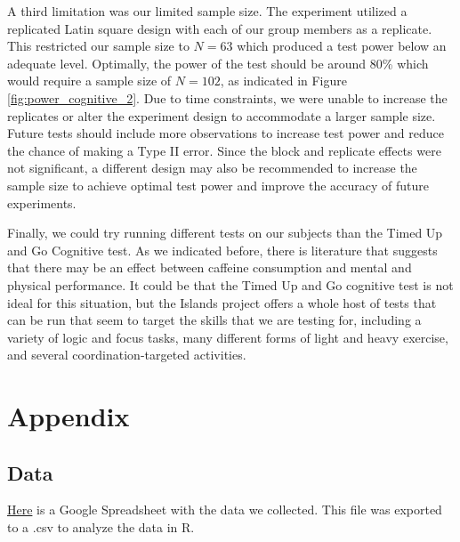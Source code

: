 \documentclass[11pt,a4paper,twoside]{tau-book}
\begin{document}
A third limitation was our limited sample size. The experiment utilized a replicated Latin square design with each of our group members as a replicate. This restricted our sample size to $N=63$ which produced a test power below an adequate level. Optimally, the power of the test should be around 80\% which would require a sample size of $N=102$, as indicated in Figure \ref{fig:power_cognitive_2}. Due to time constraints, we were unable to increase the replicates or alter the experiment design to accommodate a larger sample size. Future tests should include more observations to increase test power and reduce the chance of making a Type II error. Since the block and replicate effects were not significant, a different design may also be recommended to increase the sample size to achieve optimal test power and improve the accuracy of future experiments.

Finally, we could try running different tests on our subjects than the Timed Up and Go Cognitive test. As we indicated before, there is literature that suggests that there may be an effect between caffeine consumption and mental and physical performance. It could be that the Timed Up and Go cognitive test is not ideal for this situation, but the Islands project offers a whole host of tests that can be run that seem to target the skills that we are testing for, including a variety of logic and focus tasks, many different forms of light and heavy exercise, and several coordination-targeted activities. 

\newpage

\printbibliography

\newpage

\appendix \section{Appendix}\label{appendix}

\subsection{Data}
\href{https://docs.google.com/spreadsheets/d/15w2DWU1tjqDd9jpK0eBlqL89jGZZJeL1wOMOckCUdbw/edit?usp=sharing}{Here} is a Google Spreadsheet with the data we collected. This file was exported to a .csv to analyze the data in R.
\end{document}
